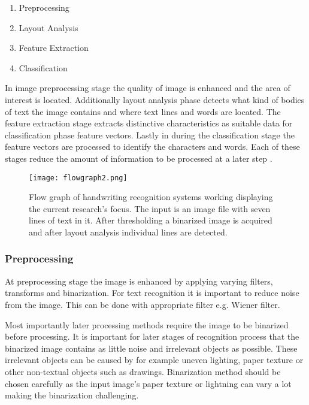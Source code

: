 \documentclass{article}
\begin{document}
    \begin{enumerate}
      \item{Preprocessing}
      \item{Layout Analysis}
      \item{Feature Extraction}
      \item{Classification}
    \end{enumerate}

    In image preprocessing stage the quality of image is enhanced and the area of interest is located. Additionally layout analysis phase detects what kind of bodies of text the image contains and where text lines and words are located. The feature extraction stage extracts distinctive characteristics as suitable data for classification phase feature vectors. Lastly in during the classification stage the feature vectors are processed to identify the characters and words. Each of these stages reduce the amount of information to be processed at a later step \cite{Cheriet2007}.

    \begin{figure}[!ht]
      \centering
      \texttt{[image: flowgraph2.png]}
      \caption{Flow graph of handwriting recognition systems working displaying the current research's focus. The input is an image file with seven lines of text in it. After thresholding a binarized image is acquired and after layout analysis individual lines are detected.  \label{fig:flow} }
    \end{figure}

      \subsubsection{Preprocessing}
        At preprocessing stage the image is enhanced by applying varying filters, transforms and binarization. For text recognition it is important to reduce noise from the image. This can be done with appropriate filter e.g. Wiener filter.

        Most  importantly later processing methods require the image to be binarized before processing. It is important for later stages of recognition process that the binarized image contains as little noise and irrelevant objects as possible.  These irrelevant objects can be caused by for example uneven lighting, paper texture or other non-textual objects such as drawings. Binarization method should be chosen carefully as the input image's paper texture or lightning can vary a lot making the binarization challenging.
\end{document}
